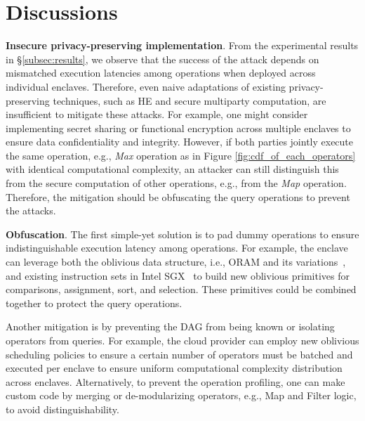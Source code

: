 \section{Discussions}
\label{sec:discussion}

\noindent \textbf{Insecure privacy-preserving implementation}.
%
From the experimental results in \S\ref{subsec:results}, we observe that the success of the attack depends on mismatched execution latencies among operations when deployed across individual enclaves.
%
Therefore, even naive adaptations of existing privacy-preserving techniques, such as HE and secure multiparty computation, are insufficient to mitigate these attacks.
%
For example, one might consider implementing secret sharing or functional encryption \cite{Xing25,Boyle25,Gilboa14,Boyle16} across multiple enclaves to ensure data confidentiality and integrity.
%
However, if both parties jointly execute the same operation, e.g.,  \textit{Max} operation as in Figure \ref{fig:cdf_of_each_operators} with identical computational complexity, an attacker can still distinguish this from the secure computation of other operations, e.g., from the \textit{Map} operation.
%
Therefore, the mitigation should be obfuscating the query operations to prevent the attacks.

\vspace{0.1cm}
\noindent \textbf{Obfuscation}.
%
The first simple-yet solution is to pad dummy operations to ensure indistinguishable execution latency among operations. 
%
For example, the enclave can leverage both the oblivious data structure, i.e., ORAM and its variations~\cite{Elaine20}, and existing instruction sets in Intel SGX~\cite{Ohrimenko16,Sasy17,Rane15} to build new oblivious primitives for comparisons, assignment, sort, and selection. 
%
These primitives could be combined together to protect the query operations.
%

Another mitigation is by preventing the DAG from being known or isolating operators from queries.
%
For example, the cloud provider can employ new oblivious scheduling policies to ensure a certain number of operators must be batched and executed per enclave to ensure uniform computational complexity distribution across enclaves.
%
Alternatively, to prevent the operation profiling, one can make custom code by merging or de-modularizing operators, e.g., Map and Filter logic, to avoid distinguishability.
%

